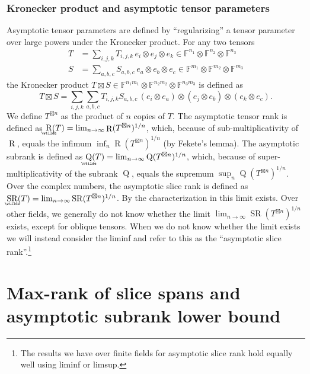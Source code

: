 \documentclass{daj}
\DeclareMathOperator{\subrank}{Q}
\DeclareMathOperator{\slicerank}{SR}
\DeclareMathOperator{\asympsubrank}{\underaccent{\wtilde}{Q}}
\DeclareMathOperator{\asympslicerank}{\underaccent{\wtilde}{SR}}
\DeclareMathOperator{\asymprank}{\underaccent{\wtilde}{R}}
\DeclareMathOperator{\tensorrank}{R}
\newcommand{\FF}{\mathbb{F}}
\begin{document}
\subsubsection*{Kronecker product and asymptotic tensor parameters}
%
Asymptotic tensor parameters are defined by ``regularizing'' a tensor parameter over large powers under the Kronecker product. For any two tensors 
\begin{align*}
T &= \sum_{i,j,k} T_{i,j,k}\, e_i \otimes e_j \otimes e_k \in \FF^{n_1} \otimes \FF^{n_2} \otimes \FF^{n_3}\\
S &= \sum_{a,b,c} S_{a,b,c} \, e_a\otimes e_b \otimes e_c \in \FF^{m_1} \otimes \FF^{m_2} \otimes \FF^{m_3}
\end{align*}
the Kronecker product $T \boxtimes S \in \FF^{n_1 m_1} \otimes \FF^{n_2 m_2} \otimes \FF^{n_3 m_3}$ is defined as
\[
T \boxtimes S = \sum_{i,j,k} \sum_{a,b,c} T_{i,j,k} S_{a,b,c}\, (e_i \otimes e_{a}) \otimes (e_j \otimes e_{b}) \otimes (e_k \otimes e_{c}).
\]
We define $T^{\boxtimes n}$ as the product of $n$ copies of $T$. The asymptotic tensor rank is defined as $\asymprank(T) = \lim_{n \to \infty} \tensorrank(T^{\boxtimes n})^{1/n}$, which, because of sub-multiplicativity of $\tensorrank$, equals the infimum $\inf_{n} \tensorrank(T^{\boxtimes n})^{1/n}$ (by Fekete's lemma). The asymptotic subrank is defined as $\asympsubrank(T) = \lim_{n \to \infty} \subrank(T^{\boxtimes n})^{1/n}$, which, because of super-multiplicativity of the subrank $\subrank$, equals the supremum $\sup_{n} \subrank(T^{\boxtimes n})^{1/n}$. Over the complex numbers, the asymptotic slice rank is defined as $\asympslicerank(T) = \lim_{n\to\infty} \slicerank(T^{\boxtimes n})^{1/n}$. By the characterization in \cite{MR4495838} this limit exists. Over other fields, we generally do not know whether the limit $\lim_{n\to\infty} \slicerank(T^{\boxtimes n})^{1/n}$ exists, except for oblique tensors. When we do not know whether the limit exists we will instead consider the liminf and refer to this as the ``asymptotic slice rank''.\footnote{The results we have over finite fields for asymptotic slice rank hold equally well using liminf or limsup.}

%

%
%
%
%
%
%
%
%
%
%
%
%
%
%
%
%
%
%
%

\section{Max-rank of slice spans and asymptotic subrank lower bound}\label{sec:max-rank}
\end{document}
